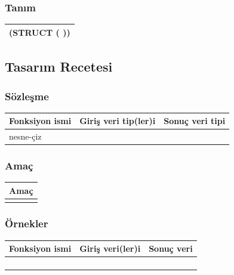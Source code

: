 \documentclass[12pt, a4paper]{article}
\newcommand\fillin[1][3cm]{\makebox[#1]{\dotfill}}
\begin{document}
\subsubsection*{Tanım}
\begin{tabular}{| p{17cm} |  }
\hline			
\vspace{0.5cm}
(STRUCT \fillin[3cm] (\fillin[10cm] ))\\[10ex]
\hline
\end{tabular}






\newpage
\subsection*{Tasarım Recetesi}
\subsubsection*{Sözleşme}
\begin{tabular}{| p{4cm} | p{8cm} | p{4cm} |  }
\hline			
Fonksiyon ismi&Giriş veri tip(ler)i&Sonuç veri tipi\\
\hline
nesne-çiz& & \\[10ex]
\hline  
\end{tabular}

\subsubsection*{Amaç}
\begin{tabular}{| p{17cm} |  }
\hline			
Amaç\\
\hline
 \\[10ex]
\hline  
\end{tabular}

\subsubsection*{Örnekler}
\begin{tabular}{| p{4cm} | p{8cm} | p{4cm} |  }
\hline			
Fonksiyon ismi&Giriş veri(ler)i&Sonuç veri\\
\hline
& & \\[6ex]
\hline  
& & \\[6ex]
\hline  
& & \\[6ex]
\hline  
& & \\[6ex]
\hline  
\end{tabular}
\end{document}

